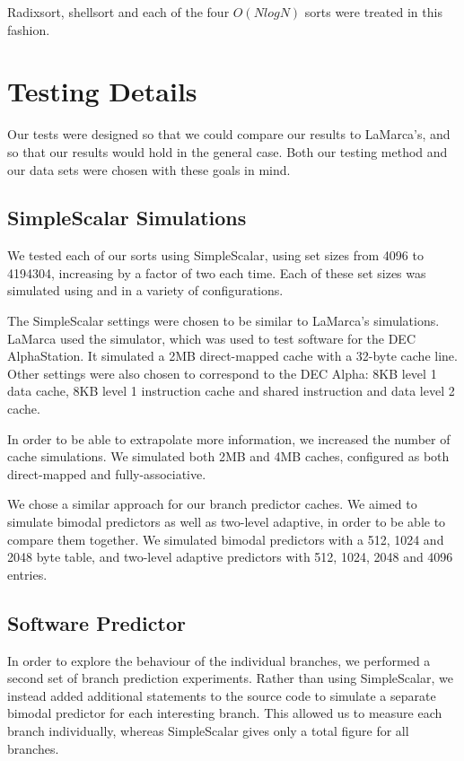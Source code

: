 Radixsort, shellsort and each of the four $O(NlogN)$ sorts were treated in this
fashion.

\section{Testing Details}

Our tests were designed so that we could compare our results to LaMarca's, and
so that our results would hold in the general case. Both our testing method and
our data sets were chosen with these goals in mind.

\subsection{SimpleScalar Simulations}

We tested each of our sorts using SimpleScalar, using set sizes from 4096 to
4194304, increasing by a factor of two each time. Each of these set sizes was
simulated using  and  in a variety of
configurations.

The SimpleScalar settings were chosen to be similar to LaMarca's simulations.
LaMarca used the  simulator, which was used to test software for the DEC
AlphaStation. It simulated a 2MB direct-mapped cache with a 32-byte cache line.
Other settings were also chosen to correspond to the DEC Alpha: 8KB level 1 data
cache, 8KB level 1 instruction cache and shared instruction and data level 2
cache.

In order to be able to extrapolate more information, we increased the number of
cache simulations. We simulated both 2MB and 4MB caches, configured as both
direct-mapped and fully-associative.

We chose a similar approach for our branch predictor caches. We aimed to
simulate bimodal predictors as well as two-level adaptive, in order to be able to
compare them together. We simulated bimodal predictors with a 512, 1024 and
2048 byte table, and two-level adaptive predictors with 512, 1024, 2048 and 4096
entries.

\subsection{Software Predictor}
In order to explore the behaviour of the individual branches, we performed a
second set of branch prediction experiments. Rather than using SimpleScalar, we
instead added additional statements to the source code to simulate a separate
bimodal predictor for each interesting branch. This allowed us to measure each
branch individually, whereas SimpleScalar gives only a total figure for all
branches.

